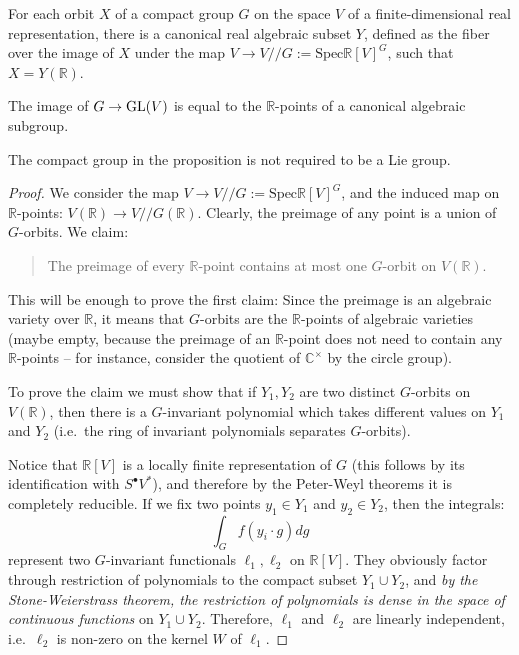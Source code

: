 \begin{proposition}
\label{proposition-compact-orbit-algebraic}
For each orbit $X$ of a compact group $G$ on the space $V$ of a finite-dimensional real representation, there is a canonical real algebraic subset $Y$, defined as the fiber over the image of $X$ under the map $V\to V// G:=\text{Spec} \mathbb R[V]^G$, such that $X=Y(\mathbb R)$.

The image of $G\to {\rm GL}(V)$ is equal to the $\mathbb R$-points of a canonical algebraic subgroup.
\end{proposition}

The compact group in the proposition is not required to be a Lie group. 

\begin{proof}
 We consider the map $V\to V// G:=\text{Spec} \mathbb R[V]^G$, and the induced map on $\mathbb R$-points: $V(\mathbb R)\to V// G(\mathbb R)$. Clearly, the preimage of any point is a union of $G$-orbits. We claim:

\begin{quote}
 The preimage of every $\mathbb R$-point contains at most one $G$-orbit on $V(\mathbb R)$.
\end{quote}

This will be enough to prove the first claim: Since the preimage is an algebraic variety over $\mathbb R$, it means that $G$-orbits are the $\mathbb R$-points of algebraic varieties (maybe empty, because the preimage of an $\mathbb R$-point does not need to contain any $\mathbb R$-points -- for instance, consider the quotient of $\mathbb C^\times$ by the circle group).

To prove the claim we must show that if $Y_1,Y_2$ are two distinct $G$-orbits on $V(\mathbb R)$, then there is a $G$-invariant polynomial which takes different values on $Y_1$ and $Y_2$ (i.e.\ the ring of invariant polynomials separates $G$-orbits). 

Notice that $\mathbb R[V]$ is a locally finite representation of $G$ (this follows by its identification with $S^\bullet V^*$), and therefore by the Peter-Weyl theorems it is completely reducible. If we fix two points $y_1\in Y_1$ and $y_2\in Y_2$, then the integrals:
$$\int_G f(y_i\cdot g) dg$$
represent two $G$-invariant functionals $\ell_1,\ell_2$ on $\mathbb R[V]$. They obviously factor through restriction of polynomials to the compact subset $Y_1\cup Y_2$, and \emph{by the Stone-Weierstrass theorem, the restriction of polynomials is dense in the space of continuous functions} on $Y_1\cup Y_2$. Therefore, $\ell_1$ and $\ell_2$ are linearly independent, i.e.\ $\ell_2$ is non-zero on the kernel $W$ of $\ell_1$. 


\end{proof}
